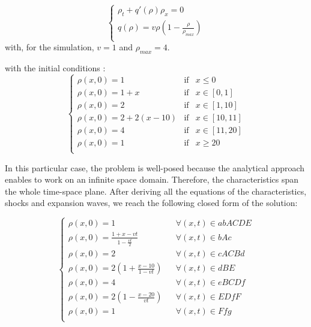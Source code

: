 \documentclass[letterpaper,10pt]{article}
\begin{document}
\begin{equation}
\left\{\begin{array}{lcl}\label{analytical_pb}
	\rho_t + q'(\rho)\rho_x = 0\\
	q(\rho) = v \rho(1- \frac{\rho}{\rho_{max}})\\
\end{array}
\right.
\end{equation}
\noindent with, for the simulation, $v=1$ and $\rho_{max}=4$.

\noindent with the initial conditions : 
\begin{equation}
\left\{\begin{array}{lcl}\label{analytical_pb_bc_ic}
	\rho(x,0) = 1 & \text{if} & x \leq  0 \\
	\rho(x,0) = 1+x & \text{if} & x \in [0,1] \\
	\rho(x,0) = 2 & \text{if} & x \in [1,10] \\
	\rho(x,0) = 2+2(x-10) & \text{if} & x \in [10,11] \\
	\rho(x,0) = 4 & \text{if} & x \in [11,20] \\
	\rho(x,0) = 1 & \text{if} & x \geq 20 \\
\end{array}\right.
\end{equation}

In this particular case, the problem is well-posed because the analytical approach enables to work on an infinite space domain. Therefore, the characteristics span the whole time-space plane.  After deriving all the equations of the characteristics, shocks and expansion waves, we reach the following closed form of the solution:

\begin{equation}
\left\{\begin{array}{lcl}\label{analytical_pb_sol}
	\rho(x,0) = 1 & & \forall (x,t) \in  abACDE \\
	\rho(x,0) = \frac{1+x-vt}{1-\frac{vt}{2}} & & \forall (x,t) \in  bAc \\
	\rho(x,0) = 2 & & \forall (x,t) \in  cACBd \\
	\rho(x,0) = 2(1+\frac{x-10}{1-vt}) & & \forall (x,t) \in  dBE \\
	\rho(x,0) = 4 & & \forall (x,t) \in  eBCDf \\
	\rho(x,0) = 2(1-\frac{x-20}{vt}) & & \forall (x,t) \in  EDfF \\
	\rho(x,0) = 1 & & \forall (x,t) \in  Ffg\\
\end{array}\right.
\end{equation}
\end{document}

